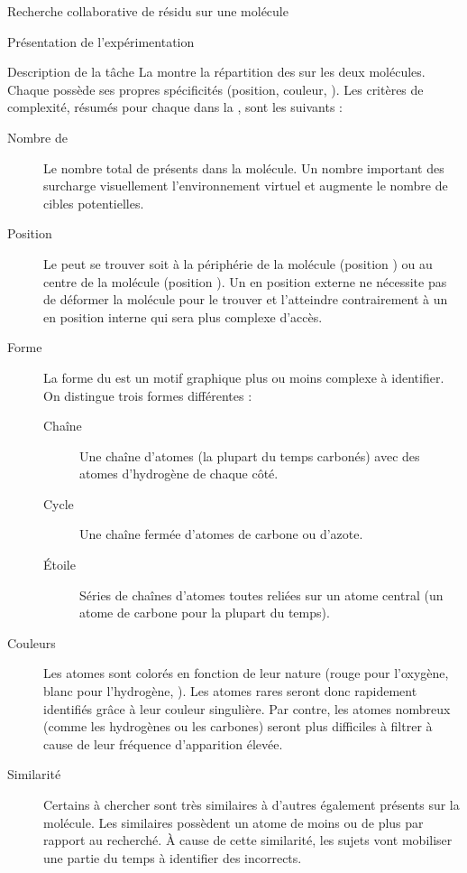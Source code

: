\documentclass[myfrancais,ngerman,english,frenchb]{mythesis}
\begin{document}
\begin{mychapter}{Recherche collaborative de résidu sur une molécule}
\begin{mysection}{Présentation de l'expérimentation}
\begin{mysubsection}{Description de la tâche}
				La  montre la répartition des  sur les deux molécules.
				Chaque  possède ses propres spécificités (position, couleur, \myetc).
				Les critères de complexité, résumés pour chaque  dans la , sont les suivants :
				\begin{description}
					\item[Nombre de ] Le nombre total de  présents dans la molécule.
						Un nombre important des  surcharge visuellement l'environnement virtuel et augmente le nombre de cibles potentielles.
					\item[Position] Le  peut se trouver soit à la périphérie de la molécule (position ) ou au centre de la molécule (position ).
						Un  en position externe ne nécessite pas de déformer la molécule pour le trouver et l'atteindre contrairement à un  en position interne qui sera plus complexe d'accès.
					\item[Forme] La forme du  est un motif graphique plus ou moins complexe à identifier.
						On distingue trois formes différentes :
						\begin{description}
							\item[Chaîne] Une chaîne d'atomes (la plupart du temps carbonés) avec des atomes d'hydrogène de chaque côté.
							\item[Cycle] Une chaîne fermée d'atomes de carbone ou d'azote.
							\item[Étoile] Séries de chaînes d'atomes toutes reliées sur un atome central (un atome de carbone pour la plupart du temps).
						\end{description}
					\item[Couleurs] Les atomes sont colorés en fonction de leur nature (rouge pour l'oxygène, blanc pour l'hydrogène, \myetc).
						Les atomes rares seront donc rapidement identifiés grâce à leur couleur singulière.
						Par contre, les atomes nombreux (comme les hydrogènes ou les carbones) seront plus difficiles à filtrer à cause de leur fréquence d'apparition élevée.
					\item[Similarité] Certains  à chercher sont très similaires à d'autres  également présents sur la molécule.
						Les  similaires possèdent un atome de moins ou de plus par rapport au  recherché.
						À cause de cette similarité, les sujets vont mobiliser une partie du temps à identifier des  incorrects.
				\end{description}


\end{mysubsection}
\end{mysection}
\end{mychapter}
\end{document}
